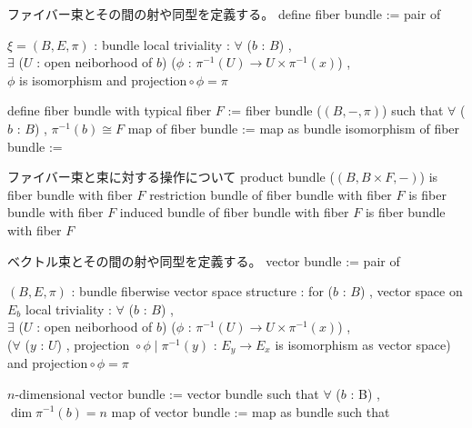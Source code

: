 \begin{Definition}
\itemnote
  ファイバー束とその間の射や同型を定義する。
\itemdefi
  define fiber bundle := pair of
  \begin{itemize}
    \itemenum \(\xi = (B , E , \pi)\) : bundle
    \itemwith local triviality :
      \(\forall\) (\(b\) : \(B\)) ,\\
      \(\exists\) (\(U\) : open neiborhood of \(b\)) (\(\phi\) : \(\pi^{-1}(U) \to U \times \pi^{-1}(x)\)) , \\
      \(\phi\) is isomorphism and \(\text{projection} \circ \phi = \pi\)
  \end{itemize}
\itemdefi
  define fiber bundle with typical fiber \(F\) := fiber bundle (\((B , - , \pi)\)) such that \(\forall\) (\(b\) : \(B\)) , \(\pi^{-1}(b) \cong F\)
\itemdefi
  map of fiber bundle := map as bundle
\itemdefi
  isomorphism of fiber bundle := 
\end{Definition}

\begin{Theorem}
\itemnote
  ファイバー束と束に対する操作について
\itemprop
  product bundle (\((B , B \times F , -)\)) is fiber bundle with fiber \(F\)
\itemprop
  restriction bundle of fiber bundle with fiber \(F\) is fiber bundle with fiber \(F\)
\itemprop
  induced bundle of fiber bundle with fiber \(F\) is fiber bundle with fiber \(F\)
\end{Theorem}

\begin{Proof}
\itemprof
\WIP
\itemprof
\WIP
\end{Proof}

\begin{Definition}
\itemnote
  ベクトル束とその間の射や同型を定義する。
\itemdefi
  vector bundle := pair of
  \begin{itemize}
    \itemenum \((B , E , \pi)\) : bundle
    \itemenum fiberwise vector space structure :
      for (\(b\) : \(B\)) , vector space on \(E_b\)
    \itemwith local triviality :
      \(\forall\) (\(b\) : \(B\)) ,\\
      \(\exists\) (\(U\) : open neiborhood of \(b\)) (\(\phi\) : \(\pi^{-1}(U) \to U \times \pi^{-1}(x)\)) , \\
      (\(\forall\) (\(y\) : \(U\)) , \(\text{projection } \circ \phi \mid \pi^{-1}(y)\) : \(E_y \to E_x\) is isomorphism as vector space) and \(\text{projection} \circ \phi = \pi\)
  \end{itemize}
\itemdefi
  \(n\)-dimensional vector bundle :=
  vector bundle such that \(\forall\) (\(b\) : B) , \(\dim \pi^{-1}(b) = n\)
\itemdefi
  map of vector bundle := map as bundle such that 
\end{Definition}


